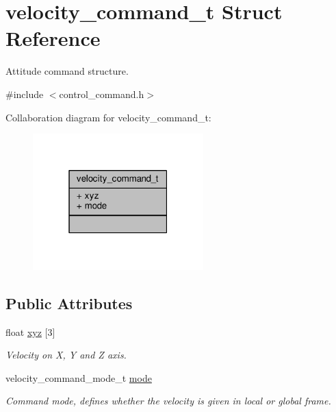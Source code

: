 \hypertarget{structvelocity__command__t}{\section{velocity\+\_\+command\+\_\+t Struct Reference}
\label{structvelocity__command__t}
}


Attitude command structure.  




{\ttfamily \#include $<$control\+\_\+command.\+h$>$}



Collaboration diagram for velocity\+\_\+command\+\_\+t\+:
\nopagebreak
\begin{figure}[H]
\begin{center}
\leavevmode
\includegraphics[width=187pt]{structvelocity__command__t__coll__graph}
\end{center}
\end{figure}
\subsection*{Public Attributes}
\begin{DoxyCompactItemize}
\item 
\hypertarget{structvelocity__command__t_ae410881f95516d811869501d19bc484d}{float \hyperlink{structvelocity__command__t_ae410881f95516d811869501d19bc484d}{xyz} \mbox{[}3\mbox{]}}\label{structvelocity__command__t_ae410881f95516d811869501d19bc484d}

\begin{DoxyCompactList}\small\item\em Velocity on X, Y and Z axis. \end{DoxyCompactList}\item 
\hypertarget{structvelocity__command__t_a5074b53f2715628e6cd2b88dfb3b1c11}{velocity\+\_\+command\+\_\+mode\+\_\+t \hyperlink{structvelocity__command__t_a5074b53f2715628e6cd2b88dfb3b1c11}{mode}}\label{structvelocity__command__t_a5074b53f2715628e6cd2b88dfb3b1c11}

\begin{DoxyCompactList}\small\item\em Command mode, defines whether the velocity is given in local or global frame. \end{DoxyCompactList}\end{DoxyCompactItemize}



